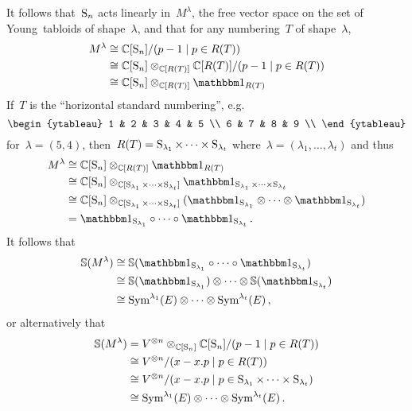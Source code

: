 \documentclass[a4paper,10pt]{scrartcl}
\begin{document}
It follows that~$\operatorname{S}_n$ acts linearly in~$M^\lambda$, the free vector space on the set of Young~tabloids of shape~$\lambda$, and that for any numbering~$T$ of shape~$\lambda$,
\begin{align*}
  M^\lambda
  &\cong
  \Complex[\symm_n]/(p - 1 \suchthat p \in R(T))
  \\
  &\cong
  \Complex[\symm_n] \tensor_{\Complex[R(T)]} \Complex[R(T)]/(p - 1 \suchthat p \in R(T))
  \\
  &\cong
  \Complex[\symm_n] \tensor_{\Complex[R(T)]} \trivrep_{R(T)}
\end{align*}
If~$T$ is the \enquote{horizontal standard numbering}, e.g.
\[
  \begin{ytableau}
     1 &  2 & 3 & 4 & 5 \\
     6 &  7 & 8 & 9 \\
  \end{ytableau}
\]
for~$\lambda = (5,4)$, then~$R(T) = \operatorname{S}_{\lambda_1} \times \dotsb \times \operatorname{S}_{\lambda_t}$ where~$\lambda = (\lambda_1, \dotsc, \lambda_t)$ and thus
\begin{align*}
  M^\lambda
  &\cong
  \Complex[\symm_n] \tensor_{\Complex[R(T)]} \trivrep_{R(T)}
  \\
  &\cong
  \Complex[\symm_n]
  \tensor_{\Complex[\symm_{\lambda_1} \times \dotsb \times \symm_{\lambda_t}]}
  \trivrep_{\symm_{\lambda_1} \times \dotsb \times \symm_{\lambda_t}}
  \\
  &\cong
  \Complex[\symm_n]
  \tensor_{\Complex[\symm_{\lambda_1} \times \dotsb \times \symm_{\lambda_t}]}
  (\trivrep_{\symm_{\lambda_1}} \tensor \dotsb \tensor \trivrep_{\symm_{\lambda_t}})
  \\
  &=
  \trivrep_{\symm_{\lambda_1}} \circ \dotsb \circ \trivrep_{\symm_{\lambda_t}} \,.
\end{align*}
It follows that
\begin{align*}
  \Schur(M^\lambda)
  &\cong
  \Schur(\trivrep_{\symm_{\lambda_1}} \circ \dotsb \circ \trivrep_{\symm_{\lambda_t}})
  \\
  &\cong
  \Schur(\trivrep_{\symm_{\lambda_1}}) \tensor \dotsb \tensor \Schur(\trivrep_{\symm_{\lambda_t}})
  \\
  &\cong
  \Symm^{\lambda_1}(E) \tensor \dotsb \tensor \Symm^{\lambda_t}(E) \,,
\end{align*}
or alternatively that
\begin{align*}
  \Schur(M^\lambda)
  &=
  V^{\tensor n} \tensor_{\Complex[\symm_n]} \Complex[\symm_n]/(p - 1 \suchthat p \in R(T))
  \\
  &\cong
  V^{\tensor n}/(x - x.p \suchthat p \in R(T))
  \\
  &\cong
  V^{\tensor n}/(x - x.p \suchthat p \in \symm_{\lambda_1} \times \dotsb \times \symm_{\lambda_t})
  \\
  &\cong
  \Symm^{\lambda_1}(E) \otimes \dotsb \otimes \Symm^{\lambda_t}(E) \,.
\end{align*}
\end{document}

